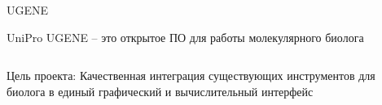 \documentclass[utf8, professionalfonts]{beamer}
\begin{document}
\begin{frame}{UGENE}
\begin{center}
\Large{UniPro UGENE -- это открытое ПО для работы молекулярного биолога}
\end{center}

\begin{columns}
	
	Цель проекта: Качественная интеграция существующих инструментов для биолога в единый графический и вычислительный интерфейс
	
\end{columns}
\end{frame}
\end{document}
